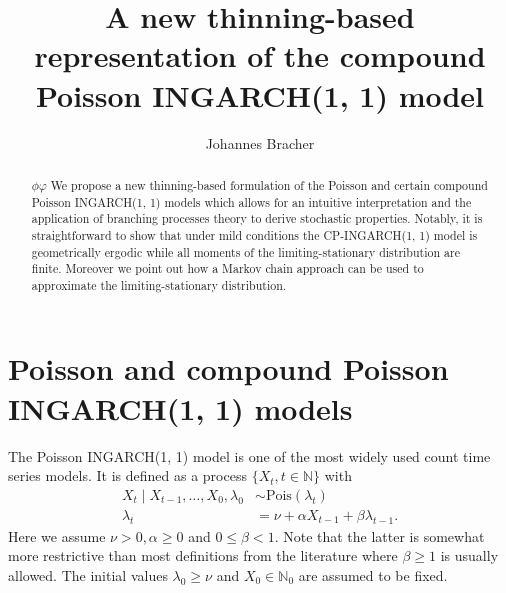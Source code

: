 \documentclass[review]{elsarticle}
\begin{document}
\title{A new thinning-based representation of the compound Poisson INGARCH(1, 1) model}
\author{Johannes Bracher}
\address{Chair of Statistics and Econometrics, Karlsruhe Institute of Technology, \\ %
Computational Statistics Group, Heidelberg Institute for Theoretical Studies}


\newcommand{\juv}{S}



\begin{abstract}
$\phi \varphi$
We propose a new thinning-based formulation of the Poisson and certain compound Poisson INGARCH(1, 1) models which allows for an intuitive interpretation and the application of branching processes theory to derive stochastic properties. Notably, it is straightforward to show that under mild conditions the CP-INGARCH(1, 1) model is geometrically ergodic while all moments of the limiting-stationary distribution are finite. Moreover we point out how a Markov chain approach can be used to approximate the limiting-stationary distribution.
\end{abstract}

\maketitle


\section{Poisson and compound Poisson INGARCH(1, 1) models}
\label{sec:original_formulation}

The Poisson INGARCH(1, 1) model \cite{Ferland2006, Fokianos2009} is one of the most widely used count time series models. It is defined as a process $\{X_t, t \in \mathbb{N}\}$ with
\begin{align}
X_t \mid X_{t - 1}, \dots, X_0, \lambda_0 & \sim \text{Pois}(\lambda_t)\label{eq:X_t_original}\\
\lambda_t & = \nu + \alpha X_{t - 1} + \beta \lambda_{t - 1}. \label{eq:lambda_t}
\end{align}
Here we assume $\nu > 0, \alpha \geq 0$ and $0 \leq \beta < 1$. Note that the latter is somewhat more restrictive than most definitions from the literature where $\beta \geq 1$ is usually allowed. The initial values $\lambda_0 \geq \nu$ and $X_0 \in \mathbb{N}_0$ are assumed to be fixed.
\end{document}

